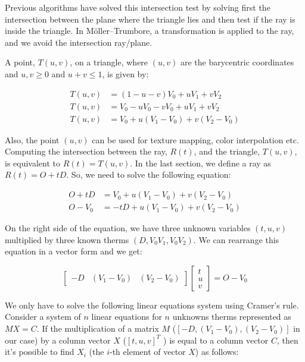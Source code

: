 \documentclass[titlepage,12pt]{report}
\begin{document}
Previous algorithms have solved this intersection test by solving first the intersection between the plane where the triangle lies and then test if the ray is inside the triangle. In Möller–Trumbore, a transformation is applied to the ray, and we avoid the intersection ray/plane.

A point, $T(u,v)$, on a triangle, where $(u,v)$ are the barycentric coordinates and $u,v \geq 0$ and $u+v \leq 1$, is given by:

\begin{equation} \label{barycentric}
\begin{split}
T(u,v) & = (1-u-v)V_0 + uV_1 + vV_2 \\
T(u,v) & = V_0 - uV_0 - vV_0 + uV_1 + vV_2 \\
T(u,v) & = V_0 + u(V_1 - V_0) + v(V_2 - V_0)
\end{split}
\end{equation}

Also, the point $(u,v)$ can be used for texture mapping, color interpolation etc. Computing the intersection between the ray, $R(t)$, and the triangle, $T(u,v)$, is equivalent to $R(t) = T(u,v)$. In the last section, we define a ray as $R(t) = O + t D$. So, we need to solve the following equation:

\begin{equation}
\begin{split}
O + tD & = V_0 + u(V_1 - V_0) + v(V_2 - V_0) \\
O - V_0 & = -tD + u(V_1 - V_0) + v(V_2 - V_0)
\end{split}
\end{equation}

On the right side of the equation, we have three unknown variables $(t,u,v)$ multiplied by three known therms $(D, V_0V_1, V_0V_2)$. We can rearrange this equation in a vector form and we get:

\begin{equation}
\begin{bmatrix}
-D & \left(V_1 - V_0\right) & \left(V_2 - V_0\right)
\end{bmatrix}
\begin{bmatrix}
t \\ u \\ v
\end{bmatrix}
= O - V_0
\end{equation}

We only have to solve the following linear equations system using Cramer's rule. Consider a system of $n$ linear equations for $n$ unknowns therms represented as $MX = C$. If the multiplication of a matrix $M$ ($\left[-D, \left(V_1 - V_0\right), \left(V_2 - V_0\right)\right]$ in our case) by a column vector $X$ ($\left[t,u,v\right]^T$ ) is equal to a column vector $C$, then it's possible to find $X_i$ (the $i$-th element of vector $X$) as follows: 
\end{document}
